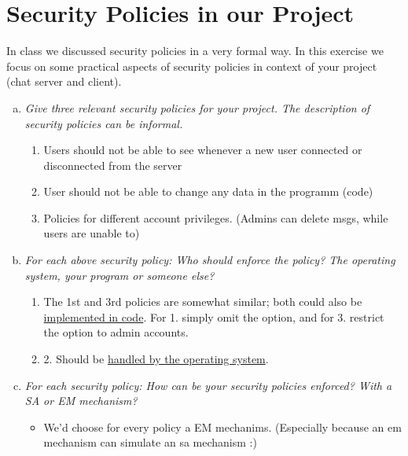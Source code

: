 \section{Security Policies in our Project}
In class we discussed security policies in a very formal way. In this exercise we focus on some  practical  aspects  of  security  policies  in  context  of  your  project  (chat server and client).
\begin{enumerate}[(a)]
    \item {\itshape Give  three  relevant  security  policies  for  your  project.  The  description  of  security policies can be informal.}
    \begin{enumerate}[1.]
        \item Users should not be able to see whenever a new user connected or disconnected from the server
        \item User should not be able to change any data in the programm (code)
        \item Policies for different account privileges. (Admins can delete msgs, while users are unable to)
    \end{enumerate}
    
    \item {\itshape For each above security policy: Who should enforce the policy? The operating system, your program or someone else?}
    \begin{enumerate}[1.]
        \item The 1st and 3rd policies are somewhat similar; both could also be \underline{implemented in code}. For 1. simply omit the option, and for 3. restrict the option to admin accounts.
        \item 2. Should be \underline{handled by the operating system}. 
    \end{enumerate}

    \item {\itshape For each security policy: How can be your security policies enforced? With a SA or EM mechanism?}
    \begin{itemize}
        \item We'd choose for every policy a EM mechanims. (Especially because an em mechanism can simulate an sa mechanism :)
    \end{itemize}

\end{enumerate}

